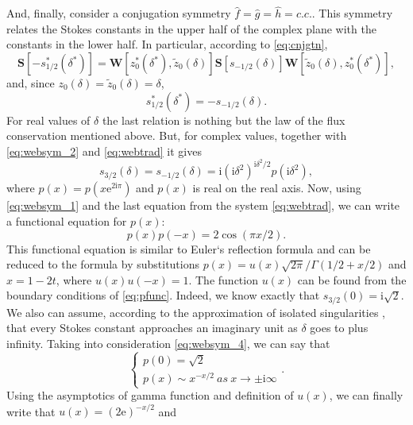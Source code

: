\documentclass[atmp]{ipart_v1}
\def\rme{\mathrm{e}}
\def\rmi{\mathrm{i}}
\def\f{\hat{f}}
\def\g{\hat{g}}
\def\h{\hat{h}}
\def\S{\bm{S}}
\def\W{\bm{W}}
\newcommand\eref[1]{\eqref{#1}}
\begin{document}
And, finally, consider a conjugation symmetry $\f=\g=\h=c.c.$. This symmetry relates the 
Stokes constants in the upper half of the complex plane with the constants in the lower half. 
In particular, according to \eref{eq:cnjgtn},
\begin{equation}
\S \left[ -s_{1/2}^*(\delta^*) \right] = 
\W \left[ z_0^*(\delta^*), \tilde{z}_0(\delta) \right]
\S \left[ s_{-1/2}(\delta) \right]
\W \left[ \tilde{z}_0(\delta),z_0^*(\delta^*) \right],
\end{equation}
and, since $z_0(\delta)=\tilde{z}_0(\delta)=\delta$,
\begin{equation}
s_{1/2}^*(\delta^*)=-s_{-1/2}(\delta).
\label{eq:websym_3}
\end{equation}
For real values of $\delta$ the last relation is nothing but the law of the flux conservation 
mentioned above. But, for complex values, together with \eref{eq:websym_2} and \eref{eq:webtrad} 
it gives
\begin{equation}
s_{3/2}(\delta)=s_{-1/2}(\delta)=\rmi(\rmi \delta^2)^{\rmi \delta^2/2}p(\rmi \delta^2),
\label{eq:websym_4}
\end{equation}
where $p(x)=p(x \rme^{2\rmi\pi})$ and $p(x)$ is real on the real axis. Now, using \eref{eq:websym_1} 
and the last equation from the system \eref{eq:webtrad}, we can write a functional equation for $p(x)$:
\begin{equation}
p(x)p(-x)=2\cos(\pi x/2).
\label{eq:pfunc}
\end{equation}
This functional equation is similar to Euler`s reflection formula \cite{gamma} and can be reduced 
to the formula by substitutions $p(x)=u(x)\sqrt{2\pi}/\Gamma(1/2+x/2)$ and $x=1-2t$, where $u(x)u(-x)=1$. 
The function $u(x)$ can be found from the boundary conditions of \eref{eq:pfunc}. Indeed, we know 
exactly \cite{rwbook} that $s_{3/2}(0)=\rmi\sqrt{2}$. We also can assume, according to the approximation of 
isolated singularities \cite{rwbook,ours}, that every Stokes constant approaches an imaginary 
unit as $\delta$ goes to plus infinity. Taking into consideration \eref{eq:websym_4}, we can say that
\begin{equation}
\begin{cases} 
p(0) = \sqrt{2} \\
p(x) \sim x^{-x/2}\ as\ x \rightarrow \pm \rmi \infty 
\end{cases}.  
\end{equation}
Using the asymptotics of gamma function and definition of $u(x)$, we can finally write 
that $u(x)=(2 \rme)^{-x/2}$ and
\end{document}
